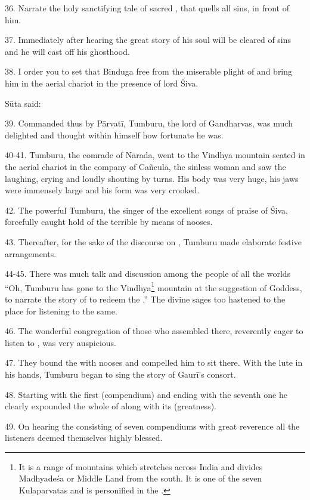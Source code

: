 36. Narrate the holy sanctifying tale of sacred , that quells all
sins, in front of him.

37. Immediately after hearing the great story of  his soul will
be cleared of sins and he will cast off his ghosthood.

38. I order you to set that Binduga free from the miserable plight of
 and bring him in the aerial chariot in the presence of lord Śiva.

Sūta said:

39. Commanded thus by Pārvatī, Tumburu, the lord of Gandharvas, was much
delighted and thought within himself how fortunate he was.

40-41. Tumburu, the comrade of Nārada, went to the Vindhya mountain seated in
the aerial chariot in the company of Cañculā, the sinless woman and saw the
 laughing, crying and loudly shouting by turns. His body was very
huge, his jaws were immensely large and his form was very crooked.

42. The powerful Tumburu, the singer of the excellent songs of praise of Śiva,
forcefully caught hold of the terrible  by means of nooses.

43. Thereafter, for the sake of the discourse on , Tumburu made
elaborate festive arrangements.

44-45. There was much talk and discussion among the people of all the worlds
“Oh, Tumburu has gone to the Vindhya\footnote{It is a range of mountains which
stretches across India and divides Madhyadeśa or Middle Land from the south. It
is one of the seven Kulaparvatas and is personified in the .}
mountain at the suggestion of Goddess, to narrate the story of 
to redeem the .” The divine sages too hastened to the place for
listening to the same.

46. The wonderful congregation of those who assembled there, reverently eager to
listen to , was very auspicious.

47. They bound the  with nooses and compelled him to sit there. With
the lute in his hands, Tumburu began to sing the story of Gaurī’s consort.

48. Starting with the first  (compendium) and ending with the
seventh one he clearly expounded the whole of  along with its
 (greatness).

49. On hearing the  consisting of seven compendiums with great
reverence all the listeners deemed themselves highly blessed.

